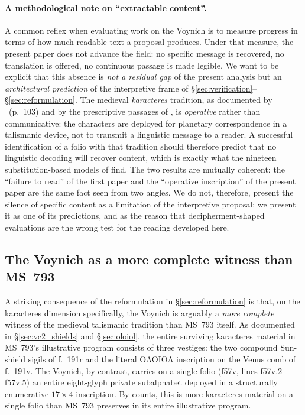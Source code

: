 \paragraph{A methodological note on ``extractable content''.} A common
reflex when evaluating work on the Voynich is to measure progress in
terms of how much readable text a proposal produces. Under that
measure, the present paper does not advance the field: no specific
message is recovered, no translation is offered, no continuous
passage is made legible. We want to be explicit that this absence is
\emph{not a residual gap} of the present analysis but an
\emph{architectural prediction} of the interpretive frame of
\S\ref{sec:verification}--\S\ref{sec:reformulation}. The medieval
\textit{karacteres} tradition, as documented by
\citet{sniezynska2009}~(p.~103) and by the prescriptive passages of
\citet{pingree1986}, is \emph{operative} rather than communicative:
the characters are deployed for planetary correspondence in a
talismanic device, not to transmit a linguistic message to a reader.
A successful identification of a folio with that tradition should
therefore predict that no linguistic decoding will recover content,
which is exactly what the nineteen substitution-based models of
\citet{jimenez2026negative} find. The two results are mutually
coherent: the ``failure to read'' of the first paper and the
``operative inscription'' of the present paper are the same fact seen
from two angles. We do not, therefore, present the silence of
specific content as a limitation of the interpretive proposal; we
present it as one of its predictions, and as the reason that
decipherment-shaped evaluations are the wrong test for the reading
developed here.

\subsection{The Voynich as a more complete witness than MS~793}
\label{sec:more_complete}

A striking consequence of the reformulation in \S\ref{sec:reformulation}
is that, on the karacteres dimension specifically, the Voynich is
arguably a \emph{more complete} witness of the medieval talismanic
tradition than MS~793 itself. As documented in \S\ref{sec:vc2_shields}
and \S\ref{sec:oloiol}, the entire surviving karacteres material in
MS~793's illustrative program consists of three vestiges: the two
compound Sun-shield sigils of f.~191r and the literal
$\mathrm{O\Lambda OIO\Lambda}$ inscription on the Venus comb of
f.~191v. The Voynich, by contrast, carries on a single folio (f57v,
lines f57v.2--f57v.5) an entire eight-glyph private subalphabet
deployed in a structurally enumerative $17\!\times\!4$ inscription.
By counts, this is more karacteres material on a single folio than
MS~793 preserves in its entire illustrative program.

